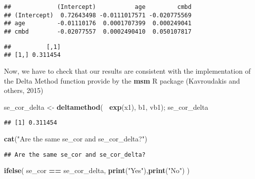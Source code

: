 \documentclass[]{article}
\newenvironment{Shaded}{\begin{snugshade}}{\end{snugshade}}
\newcommand{\DecValTok}[1]{\textcolor[rgb]{0.00,0.00,0.81}{#1}}
\newcommand{\KeywordTok}[1]{\textcolor[rgb]{0.13,0.29,0.53}{\textbf{#1}}}
\newcommand{\NormalTok}[1]{#1}
\newcommand{\OperatorTok}[1]{\textcolor[rgb]{0.81,0.36,0.00}{\textbf{#1}}}
\newcommand{\StringTok}[1]{\textcolor[rgb]{0.31,0.60,0.02}{#1}}
\begin{document}
\begin{verbatim}
##             (Intercept)           age         cmbd
## (Intercept)  0.72643498 -0.0111017571 -0.020775569
## age         -0.01110176  0.0001707399  0.000249041
## cmbd        -0.02077557  0.0002490410  0.050107817
\end{verbatim}

\begin{Shaded}
\end{Shaded}

\begin{verbatim}
##          [,1]
## [1,] 0.311454
\end{verbatim}

Now, we have to check that our results are consistent with the
implementation of the Delta Method function provide by the \textbf{msm}
R package (Kavroudakis and others, 2015)

\begin{Shaded}
\begin{Highlighting}[]
\NormalTok{se_cor_delta <-}\StringTok{ }\KeywordTok{deltamethod}\NormalTok{(}\OperatorTok{~}\StringTok{ }\KeywordTok{exp}\NormalTok{(x1), b1, vb1); se_cor_delta}
\end{Highlighting}
\end{Shaded}

\begin{verbatim}
## [1] 0.311454
\end{verbatim}

\begin{Shaded}
\begin{Highlighting}[]
\KeywordTok{cat}\NormalTok{(}\StringTok{"Are the same se_cor and se_cor_delta?"}\NormalTok{)}
\end{Highlighting}
\end{Shaded}

\begin{verbatim}
## Are the same se_cor and se_cor_delta?
\end{verbatim}

\begin{Shaded}
\begin{Highlighting}[]
\KeywordTok{ifelse}\NormalTok{(}
\NormalTok{  se_cor }\OperatorTok{==}\StringTok{ }\NormalTok{se_cor_delta,}
  \KeywordTok{print}\NormalTok{(}\StringTok{"Yes"}\NormalTok{),}\KeywordTok{print}\NormalTok{(}\StringTok{"No"}\NormalTok{)}
\NormalTok{)}
\end{Highlighting}
\end{Shaded}
\end{document}
